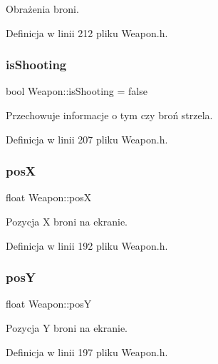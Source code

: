 Obrażenia broni. 



Definicja w linii 212 pliku Weapon.\+h.

\mbox{\label{class_weapon_aa546d4d559c3fe1d7aefa13f62eb2890}} 
\subsubsection{\texorpdfstring{is\+Shooting}{isShooting}}
{\footnotesize\ttfamily bool Weapon\+::is\+Shooting = false\hspace{0.3cm}{\ttfamily [protected]}}



Przechowuje informacje o tym czy broń strzela. 



Definicja w linii 207 pliku Weapon.\+h.

\mbox{\label{class_weapon_a977cf65797ba61f2b8cba78a6cd6adfa}} 
\subsubsection{\texorpdfstring{posX}{posX}}
{\footnotesize\ttfamily float Weapon\+::posX\hspace{0.3cm}{\ttfamily [protected]}}



Pozycja X broni na ekranie. 



Definicja w linii 192 pliku Weapon.\+h.

\mbox{\label{class_weapon_a17ab9aa81f8c4476b43a8f71cd93a994}} 
\subsubsection{\texorpdfstring{posY}{posY}}
{\footnotesize\ttfamily float Weapon\+::posY\hspace{0.3cm}{\ttfamily [protected]}}



Pozycja Y broni na ekranie. 



Definicja w linii 197 pliku Weapon.\+h.

